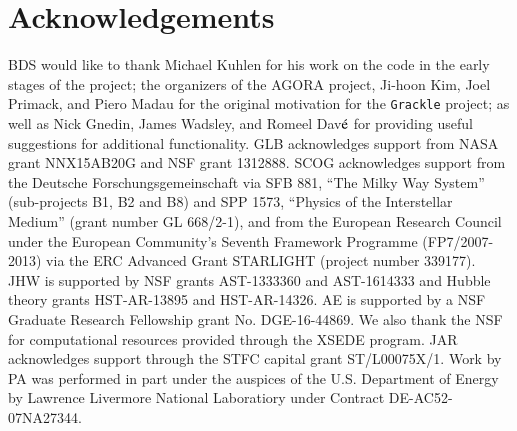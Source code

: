 \section*{Acknowledgements}

BDS would like to thank Michael Kuhlen for his work on the code in the
early stages of the project; the organizers of the AGORA project,
Ji-hoon Kim, Joel Primack, and Piero Madau for the original motivation
for the \texttt{Grackle} project; as well as Nick Gnedin, James
Wadsley, and Romeel Dav$\acute{\rm e}$ for providing useful
suggestions for additional functionality.  GLB acknowledges support
from NASA grant NNX15AB20G and NSF grant 1312888. SCOG acknowledges
support from the Deutsche Forschungsgemeinschaft via SFB 881, ``The
Milky Way System'' (sub-projects B1, B2 and B8) and SPP 1573,
``Physics of the Interstellar Medium'' (grant number GL 668/2-1), and
from the European Research Council under the European Community's
Seventh Framework Programme (FP7/2007-2013) via the ERC Advanced Grant
STARLIGHT (project number 339177).  JHW is supported by NSF grants
AST-1333360 and AST-1614333 and Hubble theory grants HST-AR-13895 and
HST-AR-14326.  AE is supported by a NSF Graduate Research Fellowship
grant No. DGE-16-44869. We also thank the NSF for computational
resources provided through the XSEDE program. JAR acknowledges support
through the STFC capital grant ST/L00075X/1.  Work by PA was performed
in part under the auspices of the U.S. Department of Energy by
Lawrence Livermore National Laboratiory under Contract
DE-AC52-07NA27344.

